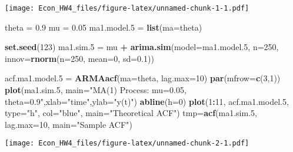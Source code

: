 \documentclass[]{article}
\newenvironment{Shaded}{\begin{snugshade}}{\end{snugshade}}
\newcommand{\KeywordTok}[1]{\textcolor[rgb]{0.13,0.29,0.53}{\textbf{#1}}}
\newcommand{\DataTypeTok}[1]{\textcolor[rgb]{0.13,0.29,0.53}{#1}}
\newcommand{\DecValTok}[1]{\textcolor[rgb]{0.00,0.00,0.81}{#1}}
\newcommand{\FloatTok}[1]{\textcolor[rgb]{0.00,0.00,0.81}{#1}}
\newcommand{\StringTok}[1]{\textcolor[rgb]{0.31,0.60,0.02}{#1}}
\newcommand{\OperatorTok}[1]{\textcolor[rgb]{0.81,0.36,0.00}{\textbf{#1}}}
\newcommand{\NormalTok}[1]{#1}
\begin{document}
\texttt{[image: Econ\_HW4\_files/figure-latex/unnamed-chunk-1-1.pdf]}

\begin{Shaded}
\begin{Highlighting}[]
\NormalTok{theta =}\StringTok{ }\FloatTok{0.9}
\NormalTok{mu    =}\StringTok{ }\FloatTok{0.05}
\NormalTok{ma1.model.}\DecValTok{5}\NormalTok{ =}\StringTok{ }\KeywordTok{list}\NormalTok{(}\DataTypeTok{ma=}\NormalTok{theta)}

\KeywordTok{set.seed}\NormalTok{(}\DecValTok{123}\NormalTok{)}
\NormalTok{ma1.sim.}\DecValTok{5}\NormalTok{ =}\StringTok{ }\NormalTok{mu }\OperatorTok{+}\StringTok{ }\KeywordTok{arima.sim}\NormalTok{(}\DataTypeTok{model=}\NormalTok{ma1.model.}\DecValTok{5}\NormalTok{, }\DataTypeTok{n=}\DecValTok{250}\NormalTok{,}
                         \DataTypeTok{innov=}\KeywordTok{rnorm}\NormalTok{(}\DataTypeTok{n=}\DecValTok{250}\NormalTok{, }\DataTypeTok{mean=}\DecValTok{0}\NormalTok{, }\DataTypeTok{sd=}\FloatTok{0.1}\NormalTok{))}

\NormalTok{acf.ma1.model.}\DecValTok{5}\NormalTok{ =}\StringTok{ }\KeywordTok{ARMAacf}\NormalTok{(}\DataTypeTok{ma=}\NormalTok{theta, }\DataTypeTok{lag.max=}\DecValTok{10}\NormalTok{)}
\KeywordTok{par}\NormalTok{(}\DataTypeTok{mfrow=}\KeywordTok{c}\NormalTok{(}\DecValTok{3}\NormalTok{,}\DecValTok{1}\NormalTok{))}
    \KeywordTok{plot}\NormalTok{(ma1.sim.}\DecValTok{5}\NormalTok{, }\DataTypeTok{main=}\StringTok{"MA(1) Process: mu=0.05, theta=0.9"}\NormalTok{,}\DataTypeTok{xlab=}\StringTok{"time"}\NormalTok{,}\DataTypeTok{ylab=}\StringTok{"y(t)"}\NormalTok{)}
    \KeywordTok{abline}\NormalTok{(}\DataTypeTok{h=}\DecValTok{0}\NormalTok{)}
    \KeywordTok{plot}\NormalTok{(}\DecValTok{1}\OperatorTok{:}\DecValTok{11}\NormalTok{, acf.ma1.model.}\DecValTok{5}\NormalTok{, }\DataTypeTok{type=}\StringTok{"h"}\NormalTok{, }\DataTypeTok{col=}\StringTok{"blue"}\NormalTok{, }\DataTypeTok{main=}\StringTok{"Theoretical ACF"}\NormalTok{)}
\NormalTok{    tmp=}\KeywordTok{acf}\NormalTok{(ma1.sim.}\DecValTok{5}\NormalTok{, }\DataTypeTok{lag.max=}\DecValTok{10}\NormalTok{, }\DataTypeTok{main=}\StringTok{"Sample ACF"}\NormalTok{)}
\end{Highlighting}
\end{Shaded}

\texttt{[image: Econ\_HW4\_files/figure-latex/unnamed-chunk-2-1.pdf]}
\end{document}
